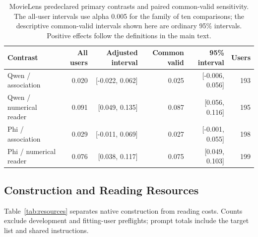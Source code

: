 \begin{table}[t]
\centering\small
\caption{MovieLens predeclared primary contrasts and paired common-valid sensitivity. The all-user intervals use alpha 0.005 for the family of ten comparisons; the descriptive common-valid intervals shown here are ordinary 95\% intervals. Positive effects follow the definitions in the main text.}
\label{tab:contrasts-movielens}
\begin{tabular}{lrrrrr}
\toprule
Contrast & All users & Adjusted interval & Common valid & 95\% interval & Users\\
\midrule
Qwen / association & 0.020 & [-0.022, 0.062] & 0.025 & [-0.006, 0.056] & 193\\
Qwen / numerical reader & 0.091 & [0.049, 0.135] & 0.087 & [0.056, 0.116] & 195\\
Phi / association & 0.029 & [-0.011, 0.069] & 0.027 & [-0.001, 0.055] & 198\\
Phi / numerical reader & 0.076 & [0.038, 0.117] & 0.075 & [0.049, 0.103] & 199\\
\bottomrule
\end{tabular}
\end{table}

\subsection{Construction and Reading Resources}
Table~\ref{tab:resources} separates native construction from reading costs. Counts exclude development and fitting-user preflights; prompt totals include the target list and shared instructions.

